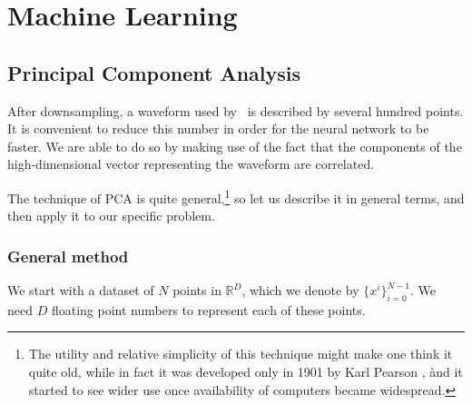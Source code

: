 \documentclass[main.tex]{subfiles}
\begin{document}
\section{Machine Learning}

\subsection{Principal Component Analysis} \label{sec:principal-component-analysis}

After downsampling, a waveform used by \mb \ is described by several hundred points.
It is convenient to reduce this number in order for the neural network to be faster.
We are able to do so by making use of the fact that the components of the high-dimensional vector representing the waveform are correlated. 

The technique of \ac{PCA} is quite general,\footnote{The utility and relative simplicity of this technique might make one think it quite old, while in fact it was developed only in 1901 by Karl Pearson \cite[]{pearsonLIIILinesPlanes1901,manlyMultivariateStatisticalMethods2017}, ànd it started to see wider use once availability of computers became widespread.} so let us describe it in general terms, and then apply it to our specific problem.

\subsubsection{General method}

We start with a dataset of \(N\) points in \(\mathbb{R}^{D}\), which we denote by \(\{ x^{i}\}_{i=0}^{N-1}\).
We need \(D\) floating point numbers to represent each of these points.
\end{document}
